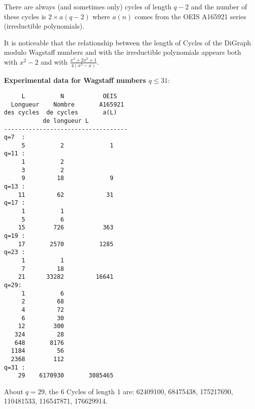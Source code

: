 \documentclass[latin1]{quadrature}
\newcommand{\PMod}[1]{\!\!\pmod{#1}}
\newif\ifenfrancais
\begin{document}
\begin{article}
\begin{article}
\vspace{.05in}
\ifenfrancais
Il y a toujours (et parfois uniquement, quand $q-2$ est premier) des Cycles de longueur $q-2$ ; et le nombre de ces Cycles est $2 \times a(q-2)$ o\`u $a(n)$ vient de la s\'erie A165921 d'OEIS (polyn\^omes irr\'eductibles).
\else
There are always (and sometimes only) cycles of length $q-2$ and the number of these cycles is $2 \times a(q-2)$ where $a(n)$ comes from the OEIS A165921 series (irreductible polynomials).
\fi

\vspace{.05in}
\ifenfrancais
Il est remarquable que la relation entre le nombre de Cycles du DiGraph modulo un nombre de Wagstaff et les polyn\^omes irr\'eductibles apparaisse \`a la fois avec 
$x^2-2$ et avec $\frac{ x^4+2x^2+1}{ 4(x^3-x)}$.
\else
It is noticeable that the relationship between the length of Cycles of the DiGraph modulo Wagstaff numbers and with the irreductible polynomials appears both with $x^2-2$ and with $\frac{ x^4+2x^2+1}{ 4(x^3-x)}$.
\fi

\vspace{.2in}
\ifenfrancais
\textbf{Donn\'es exp\'erimentales pour les  Wagstaff $q \leq 31$}:
\else
\textbf{Experimental data for Wagstaff numbers $q \leq 31$}:
\fi
\vspace{-.2in}
\small
\begin{verbatim}
     L          N           OEIS
  Longueur    Nombre       A165921
des cycles  de cycles       a(L)
           de longueur L    
-----------------------------------
q=7  :
     5          2             1
q=11 :
     1          2
     3          2     
     9         18             9
q=13 :
    11         62            31
q=17 :
     1          1
     5          6     
    15        726           363
q=19 :
    17       2570          1285
q=23 :
     1          1
     7         18     
    21      33282         16641
q=29:
     1          6
     2         68
     4         72
     6         30
    12        300
   324         28
   648       8176
  1184         56
  2368        112
q=31 :
    29    6170930       3085465 
\end{verbatim}
\normalsize

\ifenfrancais
Concernant $q=29$, les 6 Cycles de longueur 1 sont :
                  62409100,
                  68475438,
                175217690,
                110481533,
                116547871,
                176629914.
\else
About $q=29$, the 6 Cycles of length 1 are:
                  62409100,
                  68475438,
                175217690,
                110481533,
                116547871,
                176629914.
\fi


\end{article}
\end{article}
\end{document}
